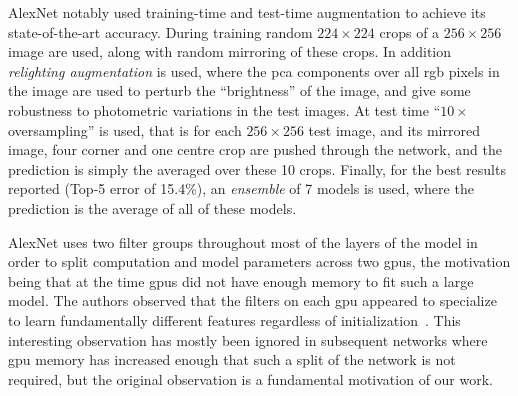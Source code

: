 \documentclass[thesis]{subfiles}
\begin{document}
AlexNet notably used training-time and test-time augmentation to achieve its state-of-the-art accuracy. During training random $224 \times 224$ crops of a $256 \times 256$ image are used, along with random mirroring of these crops. In addition \emph{relighting augmentation} is used, where the \gls{pca} components over all \gls{rgb} pixels in the image are used to perturb the ``brightness'' of the image, and give some robustness to photometric variations in the test images. At test time ``$10\times$ oversampling'' is used, that is for each $256\times 256$ test image, and its mirrored image, four corner and one centre crop are pushed through the network, and the prediction is simply the averaged over these 10 crops. Finally, for the best results reported (Top-5 error of 15.4\%), an \emph{ensemble} of 7 models is used, where the prediction is the average of all of these models. 

AlexNet uses two filter groups throughout most of the layers of the model in order to split computation and model parameters across two \gls{gpu}s, the motivation being that at the time \gls{gpu}s did not have enough memory to fit such a large model. The authors observed that the filters on each \gls{gpu} appeared to specialize to learn fundamentally different features regardless of initialization~\citep{Krizhevsky2012}. This interesting observation has mostly been ignored in subsequent networks where \gls{gpu} memory has increased enough that such a split of the network is not required, but the original observation is a fundamental motivation of our work.
\end{document}
